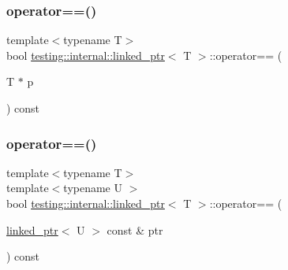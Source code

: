 \mbox{\label{classtesting_1_1internal_1_1linked__ptr_ad87ac8ff5543b6fad66e2f3c9844581a}} 
\subsubsection{\texorpdfstring{operator==()}{operator==()}\hspace{0.1cm}{\footnotesize\ttfamily [1/2]}}
{\footnotesize\ttfamily template$<$typename T$>$ \\
bool \hyperlink{classtesting_1_1internal_1_1linked__ptr}{testing\+::internal\+::linked\+\_\+ptr}$<$ T $>$\+::operator== (\begin{DoxyParamCaption}\item[{T $\ast$}]{p }\end{DoxyParamCaption}) const\hspace{0.3cm}{\ttfamily [inline]}}

\mbox{\label{classtesting_1_1internal_1_1linked__ptr_a79306e959a4ae7b3a9da641d2ba06ce6}} 
\subsubsection{\texorpdfstring{operator==()}{operator==()}\hspace{0.1cm}{\footnotesize\ttfamily [2/2]}}
{\footnotesize\ttfamily template$<$typename T$>$ \\
template$<$typename U $>$ \\
bool \hyperlink{classtesting_1_1internal_1_1linked__ptr}{testing\+::internal\+::linked\+\_\+ptr}$<$ T $>$\+::operator== (\begin{DoxyParamCaption}\item[{\hyperlink{classtesting_1_1internal_1_1linked__ptr}{linked\+\_\+ptr}$<$ U $>$ const \&}]{ptr }\end{DoxyParamCaption}) const\hspace{0.3cm}{\ttfamily [inline]}}

